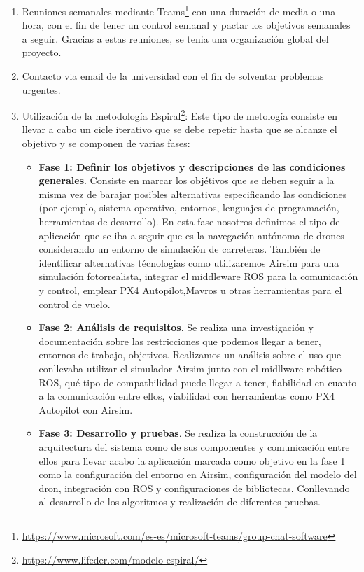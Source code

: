 \begin{enumerate}
    \item Reuniones semanales mediante Teams\footnote{\url{https://www.microsoft.com/es-es/microsoft-teams/group-chat-software}} con una duración de media o una hora, con el fin de tener un control semanal y pactar los objetivos semanales a seguir. Gracias a estas reuniones, se tenia una organización global del proyecto. 
    \item Contacto via email de la universidad con el fin de solventar problemas urgentes. 
    \item Utilización de la metodología Espiral\footnote{\url{https://www.lifeder.com/modelo-espiral/}}: Este tipo de metología consiste en llevar a cabo
    un cicle iterativo que se debe repetir hasta que se alcanze el objetivo y se componen de varias fases:
    \begin{itemize}
      \item \textbf{Fase 1: Definir los objetivos y descripciones de las condiciones generales}. Consiste en marcar los objétivos que se deben seguir a la misma vez de barajar posibles 
      alternativas especificando las condiciones (por ejemplo, sistema operativo, entornos, lenguajes de programación, herramientas de desarrollo). En esta fase nosotros definimos el tipo
      de aplicación que se iba a seguir que es la navegación autónoma de drones considerando un entorno de simulación de carreteras. También de identificar alternativas técnologias como utilizaremos
      Airsim para una simulación fotorrealista, integrar el middleware ROS para la comunicación y control, emplear PX4 Autopilot,Mavros u otras herramientas para el control de vuelo. \newline
      \item \textbf{Fase 2: Análisis de requisitos}. Se realiza una investigación y documentación sobre las restricciones que podemos llegar a tener, entornos de trabajo, objetivos. Realizamos
      un análisis sobre el uso que conllevaba utilizar el simulador Airsim junto con el midllware robótico ROS, qué tipo de compatbilidad puede llegar a tener, fiabilidad en cuanto 
      a la comunicación entre ellos, viabilidad con herramientas como PX4 Autopilot con Airsim. \newline

      \item \textbf{Fase 3: Desarrollo y pruebas}. Se realiza la construcción de la arquitectura del sistema como de sus componentes y comunicación entre ellos para llevar acabo la aplicación 
      marcada como objetivo en la fase 1 como la configuración del entorno en Airsim, configuración del modelo del dron, integración con ROS y configuraciones de bibliotecas. Conllevando
      al desarrollo de los algoritmos y realización de diferentes pruebas.\newline


\end{itemize}
\end{enumerate}
